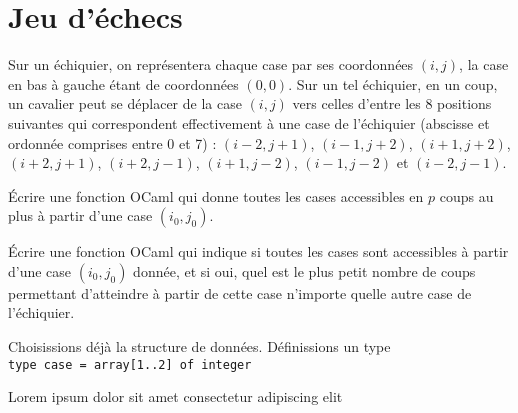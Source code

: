 \section{Jeu d'échecs}

Sur un échiquier, on représentera chaque case par ses coordonnées $(i, j)$, la case en bas à gauche étant de coordonnées $(0, 0)$. Sur un tel échiquier, en un coup, un cavalier peut se déplacer de la case $(i, j)$ vers celles d'entre les 8 positions suivantes qui correspondent effectivement à une case de l'échiquier (abscisse et ordonnée comprises entre 0 et 7) : $(i-2, j+1)$, $(i-1, j+2)$, $(i+1, j+2)$, $(i+2, j+1)$, $(i+2, j -1)$, $(i+1, j-2)$, $(i-1, j-2)$ et $(i-2,j-1)$.

\Q
Écrire une fonction OCaml qui donne toutes les cases accessibles en $p$ coups au plus à partir d'une case $(i_0, j_0)$.

\Q
Écrire une fonction OCaml qui indique si toutes les cases sont accessibles à partir d'une case $(i_0, j_0)$ donnée, et si oui, quel est le plus petit nombre de coups permettant d'atteindre à partir de cette case n'importe quelle autre case de l'échiquier.

\Corrige

\Q
Choisissions déjà la structure de données. Définissions un type\\

\texttt{type case = array[1..2] of integer}

Lorem ipsum dolor sit amet consectetur adipiscing elit

\Fin